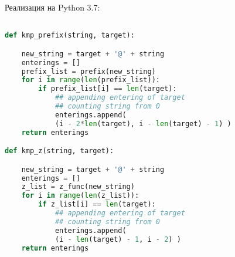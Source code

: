 \documentclass[a4paper,12pt]{article} %
\begin{document}
Реализация на Python 3.7:

\begin{lstlisting}[language=Python]

def kmp_prefix(string, target):

	new_string = target + '@' + string
	enterings = []
	prefix_list = prefix(new_string)
	for i in range(len(prefix_list)):
		if prefix_list[i] == len(target):
			## appending entering of target
			## counting string from 0
			enterings.append(
			(i - 2*len(target), i - len(target) - 1) )
	return enterings

def kmp_z(string, target):

	new_string = target + '@' + string
	enterings = []
	z_list = z_func(new_string)
	for i in range(len(z_list)):
		if z_list[i] == len(target):
			## appending entering of target
			## counting string from 0
			enterings.append(
			(i - len(target) - 1, i - 2) )
	return enterings

\end{lstlisting}
\end{document}
